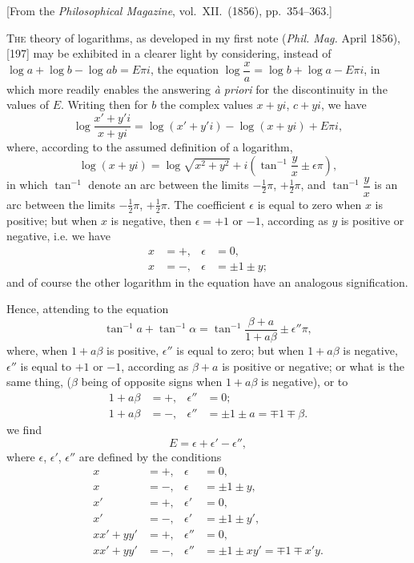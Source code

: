 \documentclass[12pt,a4paper]{article}
\theoremstyle{definition}
\begin{document}
\begin{center}
[From the \textit{Philosophical Magazine}, vol.~XII.~(1856), pp.~354--363.]
\end{center}

\bigskip

T\textsc{he} theory of logarithms, as developed in my first note (\textit{Phil. Mag.} April 1856), [197]
may be exhibited in a clearer light by considering, instead of $\log a + \log b - \log ab = E\pi i$,
the equation $\log \dfrac{x}{a} = \log b + \log a - E\pi i$, in which more readily enables the answering
\textit{\`a priori} for the discontinuity in the values of $E$. Writing then for $b$ the complex
values $x + yi$, $c + yi$, we have
\[
\log\frac{x'+y'i}{x+yi} = \log(x'+y'i) - \log(x+yi) + E\pi i,
\]
where, according to the assumed definition of a logarithm,
\[
\log(x+yi) = \log\sqrt{x^2+y^2} + i\left(\tan^{-1}\frac{y}{x} \pm \epsilon\pi\right),
\]
in which $\tan^{-1}$ denote an arc between the limits $-\tfrac{1}{2}\pi$, $+\tfrac{1}{2}\pi$, and $\tan^{-1}\dfrac{y}{x}$ is an arc between
the limits $-\tfrac{1}{2}\pi$, $+\tfrac{1}{2}\pi$. The coefficient $\epsilon$ is equal to zero when $x$ is positive; but
when $x$ is negative, then $\epsilon = +1$ or $-1$, according as $y$ is positive or negative, i.e. we
have
\begin{align*}
x &= +, & \epsilon &= 0,\\
x &= -, & \epsilon &= \pm 1\pm y;
\end{align*}
and of course the other logarithm in the equation have an analogous signification.

Hence, attending to the equation
\[
\tan^{-1}a + \tan^{-1}\alpha = \tan^{-1}\frac{\beta+a}{1+a\beta}\pm\epsilon''\pi,
\]
where, when $1 + a\beta$ is positive, $\epsilon''$ is equal to zero; but when $1 + a\beta$ is negative,
$\epsilon''$ is equal to $+1$ or $-1$, according as $\beta + a$ is positive or negative; or what is the
same thing, ($\beta$ being of opposite signs when $1 + a\beta$ is negative), or to
\begin{align*}
1 + a\beta &= +, & \epsilon'' &= 0;\\
1 + a\beta &= -, & \epsilon'' &= \pm 1 \pm a = \mp 1 \mp \beta.
\end{align*}
we find
\[
E = \epsilon + \epsilon' - \epsilon'',
\]
where $\epsilon$, $\epsilon'$, $\epsilon''$ are defined by the conditions
\begin{align*}
x &= +, & \epsilon &= 0,\\
x &= -, & \epsilon &= \pm 1 \pm y,\\
x' &= +, & \epsilon' &= 0,\\
x' &= -, & \epsilon' &= \pm 1 \pm y',\\
xx' + yy' &= +, & \epsilon'' &= 0,\\
xx' + yy' &= -, & \epsilon'' &= \pm 1 \pm xy' = \mp 1 \mp x'y.
\end{align*}
\end{document}
